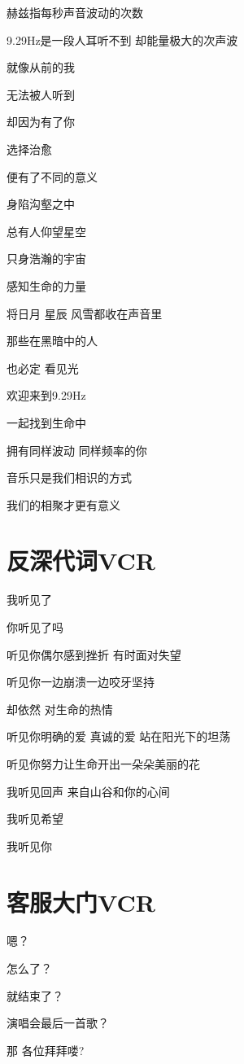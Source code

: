 \documentclass[]{ctexbook}
\begin{document}
赫兹指每秒声音波动的次数

9.29Hz是一段人耳听不到 却能量极大的次声波

就像从前的我

无法被人听到

却因为有了你

选择治愈

便有了不同的意义

身陷沟壑之中

总有人仰望星空

只身浩瀚的宇宙

感知生命的力量

将日月 星辰 风雪都收在声音里

那些在黑暗中的人

也必定 看见光

欢迎来到9.29Hz

一起找到生命中

拥有同样波动 同样频率的你

音乐只是我们相识的方式

我们的相聚才更有意义

\newpage

\section{反深代词VCR}\label{senself-vcr}

我听见了

你听见了吗

听见你偶尔感到挫折 有时面对失望

听见你一边崩溃一边咬牙坚持

却依然 对生命的热情

听见你明确的爱 真诚的爱 站在阳光下的坦荡

听见你努力让生命开出一朵朵美丽的花

我听见回声 来自山谷和你的心间

我听见希望

我听见你

\newpage

\section{客服大门VCR}\label{close-door-vcr}

嗯？

怎么了？

就结束了？

演唱会最后一首歌？

那 各位拜拜喽?
\end{document}
